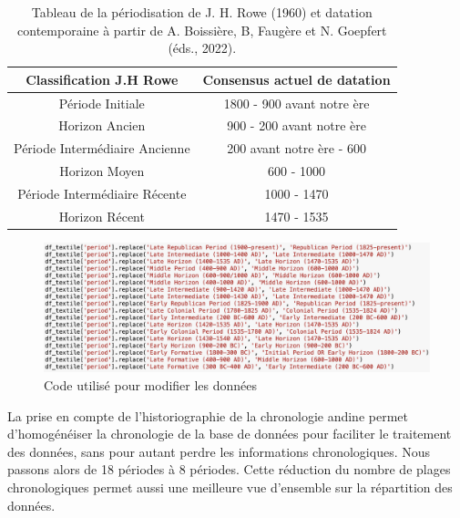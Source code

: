 \begin{table}[!h]
    \centering
    \begin{tabular}{|c|c|}
         \hline
        \textbf{Classification J.H Rowe} & \textbf{Consensus actuel de datation} \\[1ex] \hline         
        Période Initiale & 1800 - 900 avant notre ère  \\[1ex] \hline
         Horizon Ancien & 900 - 200 avant notre ère\\ [1ex]\hline
         Période Intermédiaire Ancienne & 200 avant notre ère - 600 \\[1ex] \hline
         Horizon Moyen & 600 - 1000 \\[1ex] \hline
          Période Intermédiaire Récente & 1000 - 1470 \\[1ex] \hline
         Horizon Récent & 1470 - 1535\\[1ex] \hline
    \end{tabular}
    \caption{\centering Tableau de la périodisation de J. H. Rowe (1960) et datation contemporaine à partir de A. Boissière, B, Faugère et N. Goepfert (éds., 2022).}
    \label{tab:periodsRowe}
\end{table}  

\begin{figure}[!h]
	\begin{center}
		\includegraphics[width=15cm]{../images/periods_modif.png}
           	 \caption{Code utilisé pour modifier les données}
           	 \label{codeChrono}
	 \end{center}
  \end{figure}

La prise en compte de l'historiographie de la chronologie andine permet d'homogénéiser la chronologie de la base de données pour faciliter le traitement des données, sans pour autant perdre les informations chronologiques.
Nous passons alors de 18 périodes à 8 périodes. Cette réduction du nombre de plages chronologiques permet aussi une meilleure vue d'ensemble sur la répartition des données.

\clearpage

